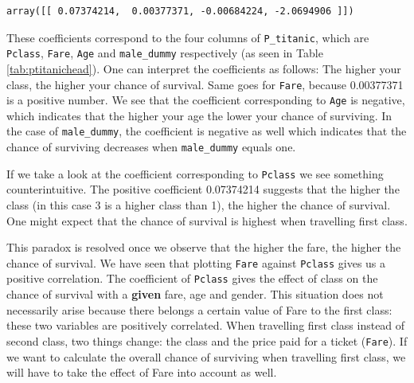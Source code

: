 \documentclass[11pt]{article}
\begin{document}
\begin{verbatim}
array([[ 0.07374214,  0.00377371, -0.00684224, -2.0694906 ]])
\end{verbatim}


These coefficients correspond to the four columns of  \texttt{P\_titanic}, which are \texttt{Pclass}, \texttt{Fare}, \texttt{Age} and \texttt{male\_dummy} respectively (as seen in Table \ref{tab:ptitanichead}). One can interpret the coefficients as follows: The higher your class, the higher your chance of survival. Same goes for \texttt{Fare}, because 0.00377371 is a positive number. We see that the coefficient corresponding to \texttt{Age} is negative, which indicates that the higher your age the lower your chance of surviving. In the case of \texttt{male\_dummy}, the coefficient is negative as well which indicates that the chance of surviving decreases when \texttt{male\_dummy} equals one. 

If we take a look at the coefficient corresponding to \texttt{Pclass} we see something counterintuitive. The positive coefficient 0.07374214 suggests that the higher the class (in this case 3 is a higher class than 1), the higher the chance of survival. One might expect that the chance of survival is highest when travelling first class.

This paradox is resolved once we observe that the higher the fare, the higher the chance of survival. We have seen that plotting \texttt{Fare} against \texttt{Pclass} gives us a positive correlation. The coefficient of \texttt{Pclass} gives the effect of class on the chance of survival with a \textbf{given} fare, age and gender. This situation does not necessarily arise because there belongs a certain value of Fare to the first class: these two variables are positively correlated. When travelling first class instead of second class, two things change: the class and the price paid for a ticket (\texttt{Fare}). If we want to calculate the overall chance of surviving when travelling first class, we will have to take the effect of Fare into account as well.  
\end{document}

